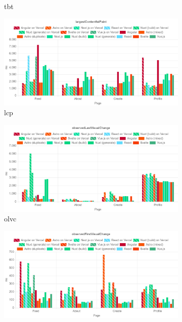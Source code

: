 \documentclass[a4paper, 12pt]{article}
\begin{document}
\begin{figure}[!h]
\begin{subfigure}{0.49\linewidth}
\begin{center}
    \end{center}
    \caption{\acrfull{tbt}}\label{subfig:LH:totalBlockingTime}
  \end{subfigure}
  \begin{subfigure}{0.49\linewidth}
    \begin{center}
      \includegraphics[width=\linewidth, keepaspectratio]{img/lighthouse-results/LCP.png}
    \end{center}
    \caption{\acrfull{lcp}}\label{subfig:LH:largestContentfulPaint}
  \end{subfigure}
  \begin{subfigure}{0.49\linewidth}
    \begin{center}
      \includegraphics[width=\linewidth, keepaspectratio]{img/lighthouse-results/OLVC.png}
    \end{center}
    \caption{\acrfull{olvc}}\label{subfig:LH:observedLastVisualChange}
  \end{subfigure}
  \begin{subfigure}{0.49\linewidth}
    \begin{center}
      \includegraphics[width=\linewidth, keepaspectratio]{img/lighthouse-results/OFVC.png}

\end{center}
\end{subfigure}
\end{figure}
\end{document}
